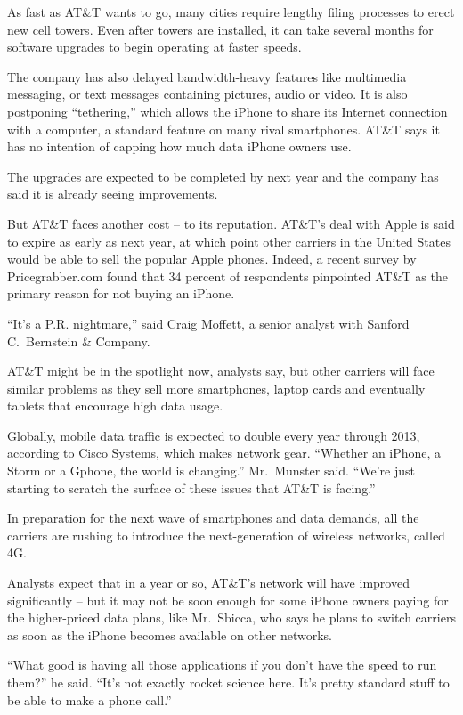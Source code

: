 ﻿\documentclass[12pt]{article}
\begin{document}
As fast as AT\&T wants to go, many cities require lengthy filing processes to erect new cell towers.
Even after towers are installed, it can take several months for software upgrades to begin operating
at faster speeds.

The company has also delayed bandwidth-heavy features like multimedia messaging, or text messages
containing pictures, audio or video. It is also postponing ``tethering,'' which allows the iPhone to
share its Internet connection with a computer, a standard feature on many rival smartphones. AT\&T
says it has no intention of capping how much data iPhone owners use.

The upgrades are expected to be completed by next year and the company has said it is already seeing
improvements.

But AT\&T faces another cost -- to its reputation. AT\&T's deal with Apple is said to expire as
early as next year, at which point other carriers in the United States would be able to sell the
popular Apple phones. Indeed, a recent survey by Pricegrabber.com found that 34 percent of
respondents pinpointed AT\&T as the primary reason for not buying an iPhone.

``It's a P.R. nightmare,'' said Craig Moffett, a senior analyst with Sanford C.~Bernstein \&
Company.

AT\&T might be in the spotlight now, analysts say, but other carriers will face similar problems as
they sell more smartphones, laptop cards and eventually tablets that encourage high data usage.

Globally, mobile data traffic is expected to double every year through 2013, according to Cisco
Systems, which makes network gear. ``Whether an iPhone, a Storm or a Gphone, the world is
changing.'' Mr.~Munster said. ``We're just starting to scratch the surface of these issues that
AT\&T is facing.''

In preparation for the next wave of smartphones and data demands, all the carriers are rushing to
introduce the next-generation of wireless networks, called 4G.

Analysts expect that in a year or so, AT\&T's network will have improved significantly -- but it may
not be soon enough for some iPhone owners paying for the higher-priced data plans, like Mr.~Sbicca,
who says he plans to switch carriers as soon as the iPhone becomes available on other networks.

``What good is having all those applications if you don't have the speed to run them?'' he said.
``It's not exactly rocket science here. It's pretty standard stuff to be able to make a phone
call.''
\end{document}
